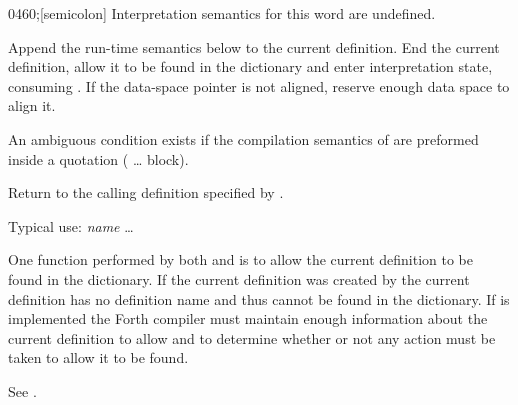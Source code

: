 
\vspace*{-1.5ex}
\begin{worddef}{0460}{;}[semicolon]
\interpret
	Interpretation semantics for this word are undefined.

\compile

	Append the run-time semantics below to the current definition. End
	the current definition, allow it to be found in the dictionary and
	enter interpretation state, consuming . If the
	data-space pointer is not aligned, reserve enough data space to
	align it.

	An ambiguous condition exists if the compilation semantics of
	\word{;} are preformed inside a quotation (\word[tools]{[:} {\ldots}
	\word[tools]{;]} block).
	
\runtime
	\stack{}{}

	Return to the calling definition specified by .


	\begin{rationale} %
		Typical use:
			\word{:} \emph{name} {\ldots} \word{;}

		One function performed by both \word{;} and 
		is to allow the current definition to be found in the
		dictionary. If the current definition was created by
		 the current definition has no definition name
		and thus cannot be found in the dictionary. If 
		is implemented the Forth compiler must maintain enough
		information about the current definition to allow \word{;} and
		 to determine whether or not any action must
		be taken to allow it to be found.
	\end{rationale}

	\begin{testing} %
		See .
	\end{testing}
\end{worddef}


